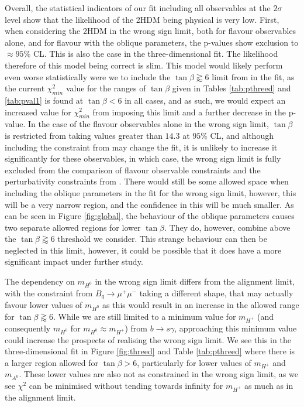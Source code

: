 \documentclass[a4paper,12pt]{article}
\begin{document}
Overall, the statistical indicators of our fit including all observables at the $2\sigma$ level show that the likelihood of the 2HDM being physical is very low. 
First, when considering the 2HDM in the wrong sign limit, both for flavour observables alone, and for flavour with the oblique parameters, the p-values show exclusion to $\approx95\%$ CL. 
This is also the case in the three-dimensional fit. 
The likelihood therefore of this model being correct is slim. 
This model would likely perform even worse statistically were we to include the $\tan\beta\gtrapprox6$ limit from \cite{oliver} in the fit, as the current $\chi^2_{min}$ value for the ranges of $\tan\beta$ given in Tables \ref{tab:pthreed} and \ref{tab:pval1} is found at $\tan\beta<6$ in all cases, and as such, we would expect an increased value for $\chi^2_{min}$ from imposing this limit and a further decrease in the p-value. 
In the case of the flavour observables alone in the wrong sign limit, $\tan\beta$ is restricted from taking values greater than $14.3$ at $95\%$ CL, and although including the constraint from \cite{oliver} may change the fit, it is unlikely to increase it significantly for these observables, in which case, the wrong sign limit is fully excluded from the comparison of flavour observable constraints and the perturbativity constraints from \cite{oliver}.
There would still be some allowed space when including the oblique parameters in the fit for the wrong sign limit, however, this will be a very narrow region, and the confidence in this will be much smaller.
As can be seen in Figure \ref{fig:global}, the behaviour of the oblique parameters causes two separate allowed regions for lower $\tan\beta$. 
They do, however, combine above the $\tan\beta\gtrapprox6$ threshold we consider. 
This strange behaviour can then be neglected in this limit, however, it could be possible that it does have a more significant impact under further study.

The dependency on $m_{H^0}$ in the wrong sign limit differs from the alignment limit, with the constraint from $B_q\to\mu^+\mu^-$ taking a different shape, that may actually favour lower values of $m_{H^0}$ as this would result in an increase in the allowed range for $\tan\beta\gtrapprox6$.
While we are still limited to a minimum value for $m_{H^+}$ (and consequently $m_{H^0}$ for $m_{H^0}\approx m_{H^+}$) from $b\to s\gamma$, approaching this minimum value could increase the prospects of realising the wrong sign limit. 
We see this in the three-dimensional fit in Figure \ref{fig:threed} and Table \ref{tab:pthreed} where there is a larger region allowed for $\tan\beta>6$, particularly for lower values of $m_{H^+}$ and $m_{A^0}$. 
These lower values are also not as constrained in the wrong sign limit, as we see $\chi^2$ can be minimised without tending towards infinity for $m_{H^+}$ as much as in the alignment limit. 
\end{document}
